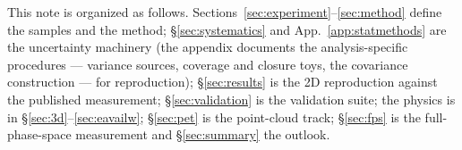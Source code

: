 This note is organized as follows.  Sections~\ref{sec:experiment}--\ref{sec:method} define the samples and the method; \S\ref{sec:systematics} and App.~\ref{app:statmethods} are the uncertainty machinery (the appendix documents the analysis-specific procedures --- variance sources, coverage and closure toys, the covariance construction --- for reproduction); \S\ref{sec:results} is the 2D reproduction against the published measurement; \S\ref{sec:validation} is the validation suite; the physics is in \S\ref{sec:3d}--\ref{sec:eavailw}; \S\ref{sec:pet} is the point-cloud track; \S\ref{sec:fps} is the full-phase-space measurement and \S\ref{sec:summary} the outlook.
